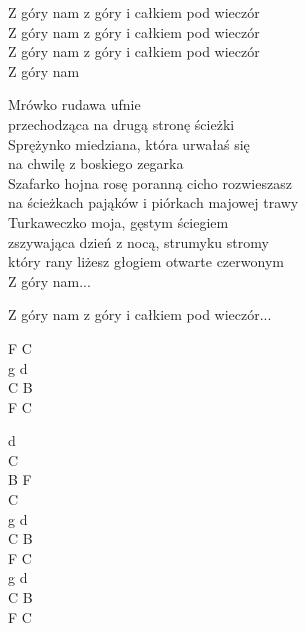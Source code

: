 \begin{text}
    \vin Z góry nam z góry i całkiem pod wieczór\\
    \vin Z góry nam z góry i całkiem pod wieczór\\
    \vin Z góry nam z góry i całkiem pod wieczór\\
    \vin Z góry nam

    Mrówko rudawa ufnie\\
    przechodząca na drugą stronę ścieżki\\
    Sprężynko miedziana, która urwałaś się\\
    na chwilę z boskiego zegarka\\
    Szafarko hojna rosę poranną cicho rozwieszasz\\
    na ścieżkach pająków i piórkach majowej trawy\\
    Turkaweczko moja, gęstym ściegiem\\
    zszywająca dzień z nocą, strumyku stromy\\
    który rany liżesz głogiem otwarte czerwonym\\
    Z góry nam...
    
    \vin Z góry nam z góry i całkiem pod wieczór...
\end{text}
\begin{chord}
    F C\\
    g d\\
    C B\\
    F C

    d\\
    C\\
    B F\\
    C\\
    g d\\
    C B\\
    F C\\
    g d\\
    C B\\
    F C
\end{chord}
